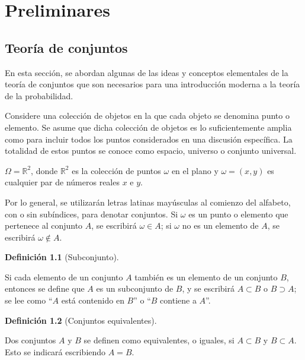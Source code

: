 \documentclass[
  us-letterpaper,
]{scrreprt}
\theoremstyle{plain}
\theoremstyle{definition}
\theoremstyle{plain}
\theoremstyle{definition}
\newtheorem{definition}{Definición}[chapter]
\theoremstyle{remark}
\begin{document}
\part{Preliminares}

\chapter{Teoría de conjuntos}\label{teoruxeda-de-conjuntos}

En esta sección, se abordan algunas de las ideas y conceptos elementales
de la teoría de conjuntos que son necesarios para una introducción
moderna a la teoría de la probabilidad.

Considere una colección de objetos en la que cada objeto se denomina
punto o elemento. Se asume que dicha colección de objetos es lo
suficientemente amplia como para incluir todos los puntos considerados
en una discusión específica. La totalidad de estos puntos se conoce como
espacio, universo o conjunto universal.

\(\Omega = \mathbb{R}^2\), donde \(\mathbb{R}^2\) es la colección de
puntos \(\omega\) en el plano y \(\omega=(x,y)\) es cualquier par de
números reales \(x\) e \(y\).

Por lo general, se utilizarán letras latinas mayúsculas al comienzo del
alfabeto, con o sin subíndices, para denotar conjuntos. Si \(\omega\) es
un punto o elemento que pertenece al conjunto \(A\), se escribirá
\(\omega \in A\); si \(\omega\) no es un elemento de \(A\), se escribirá
\(\omega \notin A\).

\begin{definition}[Subconjunto]\protect\hypertarget{def-sub}{}\label{def-sub}

Si cada elemento de un conjunto \(A\) también es un elemento de un
conjunto \(B\), entonces se define que \(A\) es un subconjunto de \(B\),
y se escribirá \(A\subset B\) o \(B\supset A\); se lee como ``\(A\) está
contenido en \(B\)'' o ``\(B\) contiene a \(A\)''.

\end{definition}

\begin{definition}[Conjuntos
equivalentes]\protect\hypertarget{def-ce}{}\label{def-ce}

Dos conjuntos \(A\) y \(B\) se definen como equivalentes, o iguales, si
\(A\subset B\) y \(B\subset A\). Esto se indicará escribiendo \(A=B\).

\end{definition}
\end{document}
